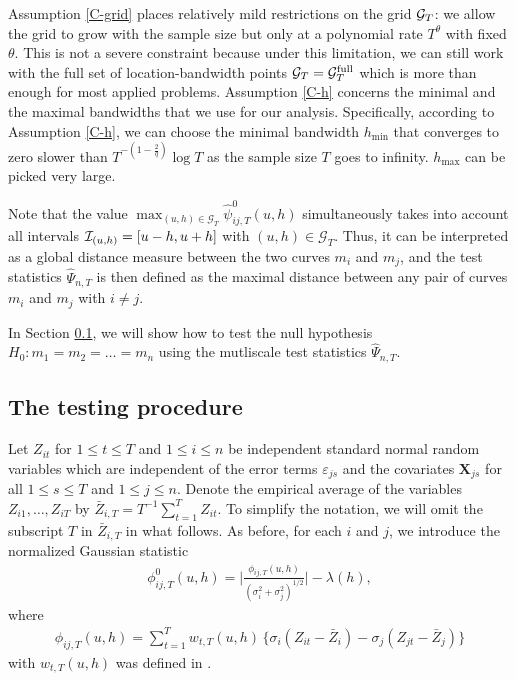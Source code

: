 \documentclass[a4paper,12pt]{article}
\makeatletter
\renewcommand{\eqref}[1]{\tagform@{\ref{#1}}}
\makeatother
\begin{document}
Assumption \ref{C-grid} places relatively mild restrictions on the grid $\mathcal{G}_T$: we allow the grid to grow with the sample size but only at a polynomial rate $T^\theta$ with fixed $\theta$. This is not a severe constraint because under this limitation, we can still work with the full set of location-bandwidth points $\mathcal{G}_T = \mathcal{G}_T^{\text{full}}$ which is more than enough for most applied problems. Assumption \ref{C-h} concerns the minimal and the maximal bandwidths that we use for our analysis. Specifically, according to Assumption \ref{C-h}, we can choose the minimal bandwidth $h_{\min}$ that converges to zero slower than $T^{-(1-\frac{2}{q})} \log T$ as the sample size $T$ goes to infinity. $h_{\max}$ can be picked very large.

Note that the value $\max_{(u,h) \in \mathcal{G}_T} \hat{\psi}^0_{ij,T}(u, h)$ simultaneously takes into account all intervals $\mathcal{I}_{(u, h)} = [u- h, u+h]$ with $(u,h) \in \mathcal{G}_T$. Thus, it can be interpreted as a global distance measure between the two curves $m_i$ and $m_j$, and the test statistics $\widehat{\Psi}_{n,T}$ is then defined as the maximal distance between any pair of curves $m_i$ and $m_j$ with $i \ne j$.

In Section \ref{subsec:test:test}, we will show how to test the null hypothesis \linebreak $H_0: m_1 =m_2 = \ldots = m_n$ using the mutliscale test statistics $\widehat{\Psi}_{n,T}$.

\subsection{The testing procedure}\label{subsec:test:test}


Let $Z_{it}$ for $1 \le t \le T$ and $1 \le i \le n$ be independent standard normal random variables which are independent of the error terms $\varepsilon_{js}$ and the covariates $\mathbf{X}_{js}$ for all $1 \leq s \leq T $ and $1 \leq j \leq n$. Denote the empirical average of the variables $Z_{i1},\ldots,Z_{iT}$ by $\bar{Z}_{i,T} = T^{-1} \sum_{t=1}^T Z_{it}$. To simplify the notation, we will omit the subscript $T$ in $\bar{Z}_{i,T}$ in what follows. As before, for each $i$ and $j$, we introduce the normalized Gaussian statistic 
\begin{align}\label{eq:phi_zero_ij}
\phi^0_{ij,T}(u, h) =  \bigg|\frac{\phi_{ij,T}(u,h)}{(\sigma_i^2 + \sigma_j^2)^{1/2}}\bigg| - \lambda(h),
\end{align}
where 
\begin{align}\label{eq:phi_ij}
\phi_{ij,T}(u,h) = \sum\nolimits_{t=1}^T w_{t,T}(u,h) \, \big\{ \sigma_i (Z_{it} - \bar{Z}_i) - \sigma_j (Z_{jt} - \bar{Z}_j) \big\}
\end{align}
with $w_{t, T}(u, h)$ was defined in \eqref{eq:weights}. 
\end{document}
